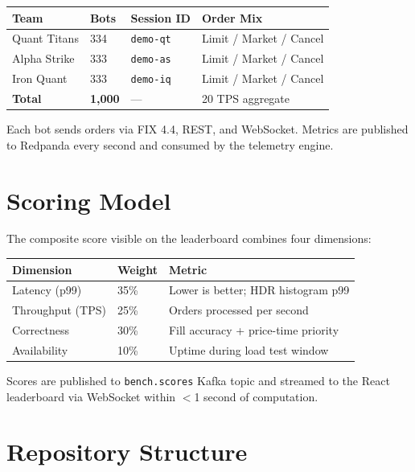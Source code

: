 \documentclass[12pt,a4paper]{article}
\begin{document}
\begin{center}
\begin{tabular}{L{4cm} C{2.5cm} C{2.5cm} C{4cm}}
  \toprule
  \textbf{Team} & \textbf{Bots} & \textbf{Session ID} & \textbf{Order Mix} \\
  \midrule
  Quant Titans  & 334 & \texttt{demo-qt} & Limit / Market / Cancel \\
  Alpha Strike  & 333 & \texttt{demo-as} & Limit / Market / Cancel \\
  Iron Quant    & 333 & \texttt{demo-iq} & Limit / Market / Cancel \\
  \midrule
  \textbf{Total} & \textbf{1,000} & — & 20 TPS aggregate \\
  \bottomrule
\end{tabular}
\end{center}

Each bot sends orders via FIX 4.4, REST, and WebSocket. Metrics are published to Redpanda every second and consumed by the telemetry engine.

\section{Scoring Model}

The composite score visible on the leaderboard combines four dimensions:

\begin{center}
\begin{tabular}{L{4cm} C{2cm} L{7cm}}
  \toprule
  \textbf{Dimension} & \textbf{Weight} & \textbf{Metric} \\
  \midrule
  Latency (p99)     & 35\%  & Lower is better; HDR histogram p99 \\
  Throughput (TPS)  & 25\%  & Orders processed per second \\
  Correctness       & 30\%  & Fill accuracy + price-time priority \\
  Availability      & 10\%  & Uptime during load test window \\
  \bottomrule
\end{tabular}
\end{center}

Scores are published to \texttt{bench.scores} Kafka topic and streamed to the React leaderboard via WebSocket within $<$1 second of computation.

\section{Repository Structure}
\end{document}
